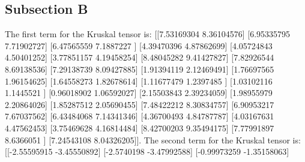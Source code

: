 \documentclass{article}%
\begin{document}
\subsection{Subsection B}%
\label{subsec:SubsectionB}%
The first term for the Kruskal tensor is: {[}{[}7.53169304 8.36104576{]}\newline%
 {[}6.95335795 7.71902727{]}\newline%
 {[}6.47565559 7.1887227 {]}\newline%
 {[}4.39470396 4.87862699{]}\newline%
 {[}4.05724843 4.50401252{]}\newline%
 {[}3.77851157 4.19458254{]}\newline%
 {[}8.48045282 9.41427827{]}\newline%
 {[}7.82926544 8.69138536{]}\newline%
 {[}7.29138739 8.09427885{]}\newline%
 {[}1.91394119 2.12469491{]}\newline%
 {[}1.76697565 1.96154625{]}\newline%
 {[}1.64558273 1.82678614{]}\newline%
 {[}1.11677479 1.2397485 {]}\newline%
 {[}1.03102116 1.1445521 {]}\newline%
 {[}0.96018902 1.06592027{]}\newline%
 {[}2.15503843 2.39234059{]}\newline%
 {[}1.98955979 2.20864026{]}\newline%
 {[}1.85287512 2.05690455{]}\newline%
 {[}7.48422212 8.30834757{]}\newline%
 {[}6.90953217 7.67037562{]}\newline%
 {[}6.43484068 7.14341346{]}\newline%
 {[}4.36700493 4.84787787{]}\newline%
 {[}4.03167631 4.47562453{]}\newline%
 {[}3.75469628 4.16814484{]}\newline%
 {[}8.42700203 9.35494175{]}\newline%
 {[}7.77991897 8.6366051 {]}\newline%
 {[}7.24543108 8.04326205{]}{]}.\newline%
%
The second term for the Kruskal tensor is: {[}{[}{-}2.55595915 {-}3.45550892{]}\newline%
 {[}{-}2.5740198  {-}3.47992588{]}\newline%
 {[}{-}0.99973259 {-}1.35158063{]}\newline%
\end{document}
